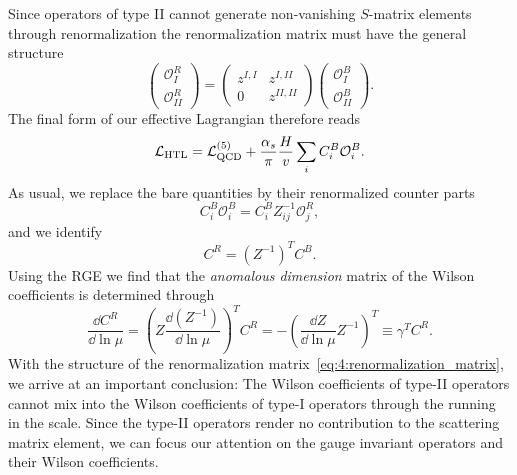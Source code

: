 Since operators of type II cannot generate non-vanishing $S$-matrix elements through renormalization the renormalization matrix must have the general structure
\begin{equation}
\begin{pmatrix}
\mathcal{O}_{I}^R \\
\mathcal{O}_{II}^R
\end{pmatrix} = \begin{pmatrix}
z^{I,I} & z^{I,II} \\
0 & z^{II,II}
\end{pmatrix} \begin{pmatrix}
\mathcal{O}_{I}^B \\
\mathcal{O}_{II}^B
\end{pmatrix}.
\label{eq:4:renormalization_matrix}
\end{equation}
The final form of our effective Lagrangian therefore reads
\begin{equation}
\mathcal{L}_{\text{HTL}} = \mathcal{L}_{\text{QCD}}^{(5)} + \frac{\alpha_s}{\pi} \frac{H}{v} \sum_{i} C_i^B \mathcal{O}_i^B.
\label{eq:4:lagrangian_operator_basis}
\end{equation}
As usual, we replace the bare quantities by their renormalized counter parts
\begin{equation}
C_i^B \mathcal{O}_i^B = C_i^B  Z_{ij}^{-1} \mathcal{O}_j^R,
\end{equation}
and we identify
\begin{equation}
C^R = (Z^{-1})^T C^B.
\end{equation}
Using the \acs{RGE} we find that the \textit{anomalous dimension} matrix of the Wilson coefficients is determined through
\begin{equation}
\frac{\dd C^R}{\dd \ln \mu} = \left(Z \frac{\dd (Z^{-1})}{\dd \ln \mu} \right)^T  C^R = - \left( \frac{\dd Z}{\dd \ln \mu} Z^{-1} \right)^T \equiv \gamma^T C^R .
\label{eq:4:anomalous_dimension_matrix}
\end{equation}
With the structure of the renormalization matrix~\eqref{eq:4:renormalization_matrix}, we arrive at an important conclusion: The Wilson coefficients of type-II operators cannot mix into the Wilson coefficients of type-I operators through the running in the scale. Since the type-II operators render no contribution to the scattering matrix element, we can focus our attention on the gauge invariant operators and their Wilson coefficients.

